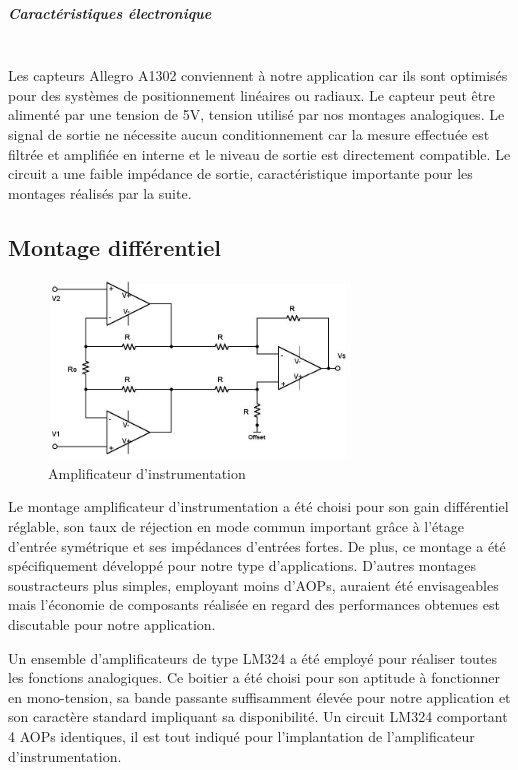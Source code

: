 \documentclass[11pt, french]{article} %
\begin{document}
\subparagraph*{Caractéristiques électronique}~\\
Les capteurs Allegro A1302 conviennent à notre application car ils sont optimisés pour des systèmes de positionnement linéaires ou radiaux. Le capteur peut être alimenté par une tension de 5V, tension utilisé par nos montages analogiques. Le signal de sortie ne nécessite aucun conditionnement car la mesure effectuée est filtrée et amplifiée en interne et le niveau de sortie est directement compatible. Le circuit a une faible impédance de sortie, caractéristique importante pour les montages réalisés par la suite.

\subsection{Montage différentiel}

\begin{figure}
  \includegraphics[width=8cm]{SolutionAnalogique/AmpInst}
  \caption{Amplificateur d'instrumentation}
\end{figure}
Le montage amplificateur d'instrumentation a été choisi pour son gain différentiel réglable, son taux de réjection en mode commun important grâce à l'étage d'entrée symétrique et ses impédances d'entrées fortes. De plus, ce montage a été spécifiquement développé pour notre type d'applications. D'autres montages soustracteurs plus simples, employant moins d'AOPs, auraient été envisageables mais l'économie de composants réalisée en regard des performances obtenues est discutable pour notre application. 

Un ensemble d'amplificateurs de type LM324 a été employé pour réaliser toutes les fonctions analogiques. Ce boitier a été choisi pour son aptitude à fonctionner en mono-tension, sa bande passante suffisamment élevée pour notre application et son caractère standard impliquant sa disponibilité. Un circuit LM324 comportant 4 AOPs identiques, il est tout indiqué pour l'implantation de l'amplificateur d'instrumentation.
\end{document}
